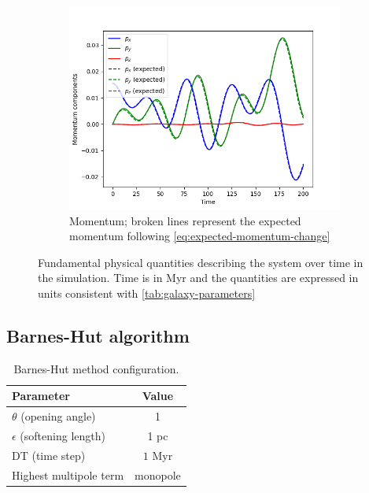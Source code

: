 \begin{figure}[htp]
    \vspace{0.2cm}

    \begin{subfigure}[b]{0.45\textwidth}
        \centering
        \includegraphics[width=\textwidth]{chapters/results/img/p3m-galaxy/momentum.png}
        \caption{Momentum; broken lines represent the expected momentum following \autoref{eq:expected-momentum-change}}
        \label{fig:physical-quantities-p3m-sub3}
    \end{subfigure}

    \caption{Fundamental physical quantities describing the system over time in the \PThreeM{} simulation.
        Time is in Myr and the quantities are expressed in units consistent with \autoref{tab:galaxy-parameters}}
    \label{fig:physical-quantities-p3m}
\end{figure}

\subsection{Barnes-Hut algorithm}
\begin{table}[htp]
    \centering
    \begin{tabular}{|l|c|}
        \hline
        \textbf{Parameter}            & \textbf{Value} \\
        \hline
        $\theta$ (opening angle)      & 1              \\
        $\epsilon$ (softening length) & 1 pc           \\
        DT (time step)                & $1$ Myr        \\
        Highest multipole term        & monopole       \\
        \hline
    \end{tabular}
    \caption{Barnes-Hut method configuration.}
    \label{tab:bh-method-parameters}
\end{table}

